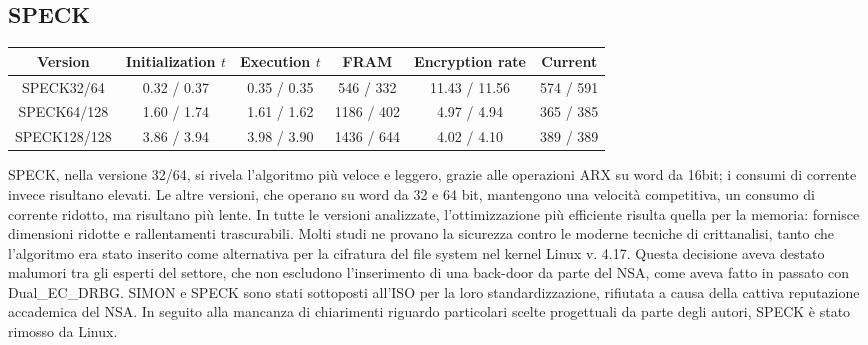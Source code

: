 \documentclass[target=bach,aauheader=,style=]{thud}
\begin{document}
		\subsection{SPECK}
		\begin{center}
			\begin{tabular}{|c| *{5}{c|}}
				\hline
				\textbf{Version} & \textbf{Initialization} $t$& \textbf{Execution} $t$ & \textbf{FRAM} & \textbf{Encryption rate} & \textbf{Current} \\
				\hline
				SPECK32/64 & \textcolor{Mahogany}{0.32} / \textcolor{OliveGreen}{0.37} & \textcolor{Mahogany}{0.35} / \textcolor{OliveGreen}{0.35} & \textcolor{Mahogany}{546} / \textcolor{OliveGreen}{332} & \textcolor{Mahogany}{11.43} / \textcolor{OliveGreen}{11.56} & \textcolor{Mahogany}{574} / \textcolor{OliveGreen}{591} \\
				\hline
				SPECK64/128 & \textcolor{Mahogany}{1.60} / \textcolor{OliveGreen}{1.74} & \textcolor{Mahogany}{1.61} / \textcolor{OliveGreen}{1.62} & \textcolor{Mahogany}{1186} / \textcolor{OliveGreen}{402} & \textcolor{Mahogany}{4.97} / \textcolor{OliveGreen}{4.94} & \textcolor{Mahogany}{365} / \textcolor{OliveGreen}{385} \\
				\hline
				SPECK128/128 & \textcolor{Mahogany}{3.86} / \textcolor{OliveGreen}{3.94} & \textcolor{Mahogany}{3.98} / \textcolor{OliveGreen}{3.90} & \textcolor{Mahogany}{1436} / \textcolor{OliveGreen}{644} & \textcolor{Mahogany}{4.02} / \textcolor{OliveGreen}{4.10} & \textcolor{Mahogany}{389} / \textcolor{OliveGreen}{389} \\
				\hline
			\end{tabular}
		\end{center}
		
		SPECK, nella versione 32/64, si rivela l'algoritmo più veloce e leggero, grazie alle operazioni ARX su word da 16bit; i consumi di corrente invece risultano elevati. Le altre versioni, che operano su word da 32 e 64 bit, mantengono una velocità competitiva, un consumo di corrente ridotto, ma risultano più lente. In tutte le versioni analizzate, l'ottimizzazione più efficiente risulta quella per la memoria: fornisce dimensioni ridotte e rallentamenti trascurabili. Molti studi ne provano la sicurezza contro le moderne tecniche di crittanalisi, tanto che l'algoritmo era stato inserito come alternativa per la cifratura del file system nel kernel Linux v. 4.17. Questa decisione aveva destato malumori tra gli esperti del settore, che non escludono l'inserimento di una back-door da parte del NSA, come aveva fatto in passato con Dual\_EC\_DRBG. SIMON e SPECK sono stati sottoposti all'ISO per la loro standardizzazione, rifiutata a causa della cattiva reputazione accademica del NSA. In seguito alla mancanza di chiarimenti riguardo particolari scelte progettuali da parte degli autori, SPECK è stato rimosso da Linux. 
\end{document}
